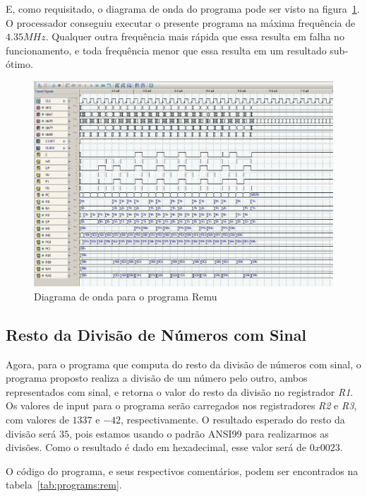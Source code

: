 \documentclass[12pt]{article}
\begin{document}
E, como requisitado, o diagrama de onda do programa pode ser visto na
figura~\ref{fig:program__remu_wave.png}. O processador conseguiu executar o
presente programa na máxima frequência de $4.35MHz$. Qualquer outra frequência
mais rápida que essa resulta em falha no funcionamento, e toda frequência menor
que essa resulta em um resultado sub-ótimo.

\begin{figure}[H]
    \centering
    \includegraphics[width=.9\textwidth]{Projeto/images/program__remu_wave.png}
    \caption{Diagrama de onda para o programa Remu}\label{fig:program__remu_wave.png}
\end{figure}


\subsection{Resto da Divisão de Números com Sinal}\label{sec:programs:rem}

Agora, para o programa que computa do resto da divisão de números com sinal, o
programa proposto realiza a divisão de um número pelo outro, ambos representados
com sinal, e retorna o valor do resto da divisão no registrador \emph{R1}. Os
valores de input para o programa serão carregados nos registradores \emph{R2} e
\emph{R3}, com valores de $1337$ e $-42$, respectivamente. O resultado esperado
do resto da divisão será $35$, pois estamos usando o padrão ANSI99 para
realizarmos as divisões. Como o resultado é dado em hexadecimal, esse valor será
de $0x0023$.

O código do programa, e seus respectivos comentários, podem ser encontrados na
tabela~\ref{tab:programs:rem}.
\end{document}
